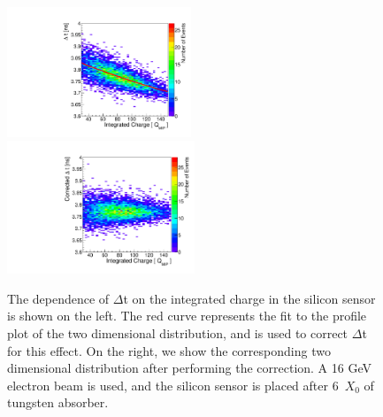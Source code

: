 \documentclass[preprint,1p]{elsarticle}
\begin{document}
\begin{figure}[htbp] 
\centering
\includegraphics[width=0.49\textwidth]{plots/DeltaT_vs_Charge_Uncorrected.pdf} 
\includegraphics[width=0.5\textwidth]{plots/DeltaT_vs_Charge_Corrected.pdf} 
\caption{ The dependence of $\Delta$t on the integrated charge in the 
silicon sensor is shown on the left. The red curve represents the fit to the
profile plot of the two dimensional distribution, and is used to correct
$\Delta$t for this effect. On the right, we show the corresponding two dimensional
distribution after performing the correction. A 16 GeV electron beam is used, and the silicon sensor is placed
after 6~$X_0$ of tungsten absorber.
} 
\label{fig:timewalk} 
\end{figure} 
\end{document}
